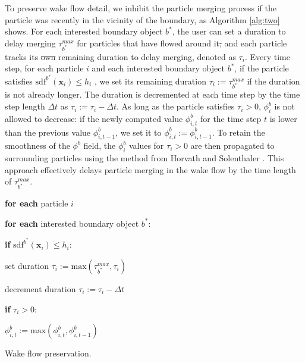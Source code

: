 \documentclass[VANCOUVER,STIX1COL]{WileyNJD-v2}
\providecommand{\DIFadd}[1]{{\protect\color{blue}\uwave{#1}}} %
\providecommand{\DIFdel}[1]{{\protect\color{red}\sout{#1}}}                      %
\providecommand{\DIFaddbegin}{} %
\providecommand{\DIFaddend}{} %
\providecommand{\DIFdelbegin}{} %
\providecommand{\DIFdelend}{} %
\begin{document}
To preserve wake flow detail, we inhibit the particle merging process if the particle was recently in the vicinity of the boundary, as Algorithm \ref{alg:two} shows. For each interested boundary object $b^*$, the user can set a duration to delay merging $\tau^{max}_{b^*}$ for particles that have flowed around it\DIFdelbegin \DIFdel{; }\DIFdelend \DIFaddbegin \DIFadd{, }\DIFaddend and each particle tracks its \DIFdelbegin \DIFdel{own }\DIFdelend remaining duration to delay merging, denoted as $\tau_i$. Every time step, for each particle $i$ and each interested boundary object $b^*$, if the particle satisfies $\mathrm{sdf}^{b^*}(\mathbf{x}_i)\leq h_i$ , we set its remaining duration $\tau_i := \tau^{max}_{b^*}$ if the duration is not already longer. The duration is decremented at each time step by the time step length $\Delta t$ as $\tau_i:=\tau_i-\Delta t$. As long as the particle satisfies $\tau_i > 0$, $\phi^b_i$ is not allowed to decrease: if the newly computed value $\phi^{b}_{i,t}$ for the time step $t$ is lower than the previous value $\phi^{b}_{i,t-1}$, we set it to $\phi^{b}_{i,t} := \phi^{b}_{i,t-1}$. To retain the smoothness of the $\phi^b$ field, the $\phi^b_i$ values for $\tau_i > 0$ are then propagated to surrounding particles using the method from Horvath and Solenthaler \cite{Horvath13}. This approach effectively delays particle merging in the wake flow by the time length of $\tau^{max}_{b^*}$.

\vspace{-0.5\baselineskip}

\begin{algorithm}[htb]
\par\setlength\parindent{2em}
\noindent \textbf{for each} particle $i$ 

\textbf{for each} interested boundary object $b^*$:

\hspace{2em}\textbf{if} $\mathrm{sdf}^{b^*}(\mathbf{x}_i)\leq h_i$:

\hspace{2em}\hspace{2em}set duration $\tau_i:=\mathrm{max}(\tau_{b^*}^{max},\tau_i)$

decrement duration $\tau_i:=\tau_i-\Delta t$

\textbf{if} $\tau_i>0$:

\hspace{2em}$\phi_{i,t}^b:=\mathrm{max}(\phi_{i,t}^b,\phi_{i,t-1}^b)$

\caption{Wake flow preservation.}
\label{alg:two}
\end{algorithm}
\end{document}
